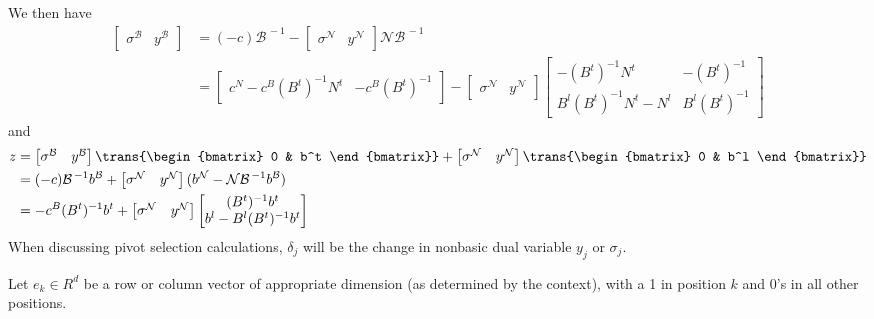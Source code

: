 We then have
\begin{equation}
\begin{split}
\begin{bmatrix} \sigma^\mathcal{B} & y^\mathcal{B} \end{bmatrix} & =
    (-c)\mathcal{B}^{\,-1} -
    \begin{bmatrix} \sigma^\mathcal{N} & y^\mathcal{N} \end{bmatrix}
    \mathcal{N}\mathcal{B}^{\,-1} \\
& = \begin{bmatrix} c^N - c^B (B^t)^{-1} N^t & -c^B (B^t)^{-1} \end{bmatrix} -
    \begin{bmatrix} \sigma^\mathcal{N} & y^\mathcal{N} \end{bmatrix}
    \begin{bmatrix}
      -(B^t)^{-1} N^t & -(B^t)^{-1} \\
      B^l(B^t)^{-1} N^t - N^l & B^l(B^t)^{-1}
    \end{bmatrix} \label{Eqn:DualBasicVars}
\end{split}
\end{equation}
and
\begin{equation}
\begin{split}
z & = \begin{bmatrix} \sigma^\mathcal{B} & y^\mathcal{B} \end{bmatrix}
      \trans{\begin{bmatrix} 0 & b^t \end{bmatrix}} +
      \begin{bmatrix} \sigma^\mathcal{N} & y^\mathcal{N} \end{bmatrix}
      \trans{\begin{bmatrix} 0 & b^l \end{bmatrix}} \\
  & = (-c)\mathcal{B}^{\,-1} b^\mathcal{B} +
      \begin{bmatrix} \sigma^\mathcal{N} & y^\mathcal{N} \end{bmatrix}
      (b^\mathcal{N} - \mathcal{N}\mathcal{B}^{\,-1} b^\mathcal{B}) \\
  & = -c^B (B^t)^{-1} b^t +
      \begin{bmatrix} \sigma^\mathcal{N} & y^\mathcal{N} \end{bmatrix}
      \begin{bmatrix} (B^t)^{-1} b^t \\ b^l - B^l(B^t)^{-1} b^t \end{bmatrix}
\end{split} \label{Eqn:DualObj}
\end{equation}
When discussing pivot selection calculations, $\delta_j$ will be the
change in nonbasic dual variable $y_j$ or $\sigma_j$.

Let $e_k \in R^d$ be a row or column vector of appropriate
dimension (as determined by the context), with a 1 in
position $k$ and 0's in all other positions.
